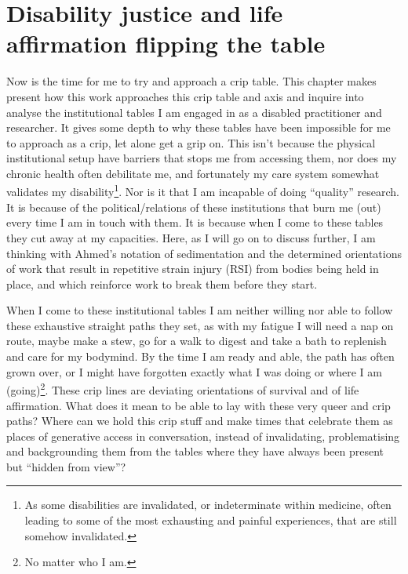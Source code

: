 \hypertarget{disability-justice-and-life-affirmation-flipping-the-table}{%
\section[Disability justice and life affirmation flipping the
table]{\texorpdfstring{\protect\hypertarget{anchor}{}{}Disability
justice and life affirmation flipping the
table}{Disability justice and life affirmation flipping the table}}\label{disability-justice-and-life-affirmation-flipping-the-table}}

Now is the time for me to try and approach a crip table. This chapter
makes present how this work approaches this crip table and axis and
inquire into analyse the institutional tables I am engaged in as a
disabled practitioner and researcher. It gives some depth to why these
tables have been impossible for me to approach as a crip, let alone get
a grip on. This isn't because the physical institutional setup have
barriers that stops me from accessing them, nor does my chronic health
often debilitate me, and fortunately my care system somewhat validates
my disability\footnote{As some disabilities are invalidated, or
  indeterminate within medicine, often leading to some of the most
  exhausting and painful experiences, that are still somehow
  invalidated.}. Nor is it that I am incapable of doing ``quality''
research. It is because of the political/relations of these institutions
that burn me (out) every time I am in touch with them. It is because
when I come to these tables they cut away at my capacities. Here, as I
will go on to discuss further, I am thinking with Ahmed's notation of
sedimentation and the determined orientations of work that result in
repetitive strain injury (RSI) from bodies being held in place, and
which reinforce work to break them before they start.

When I come to these institutional tables I am neither willing nor able
to follow these exhaustive straight paths they set, as with my fatigue I
will need a nap on route, maybe make a stew, go for a walk to digest and
take a bath to replenish and care for my bodymind. By the time I am
ready and able, the path has often grown over, or I might have forgotten
exactly what I was doing or where I am (going)\footnote{No matter who I
  am.}. These crip lines are deviating orientations of survival and of
life affirmation. What does it mean to be able to lay with these very
queer and crip paths? Where can we hold this crip stuff and make times
that celebrate them as places of generative access in conversation,
instead of invalidating, problematising and backgrounding them from the
tables where they have always been present but ``hidden from view''?


